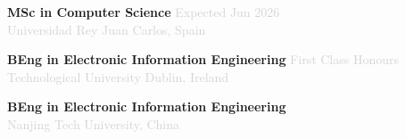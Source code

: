 \documentclass[9pt, a4paper]{article}
\begin{document}
\noindent\textbf{MSc in Computer Science} \hfill \textcolor{lightgray}{Expected Jun 2026}\\
\textcolor{lightgray}{Universidad Rey Juan Carlos, Spain}

\vspace{3pt}
\noindent\textbf{BEng in Electronic Information Engineering} \hfill \textcolor{lightgray}{First Class Honours}\\
\textcolor{lightgray}{Technological University Dublin, Ireland}

\vspace{3pt}
\noindent\textbf{BEng in Electronic Information Engineering}\\
\textcolor{lightgray}{Nanjing Tech University, China}
\end{document}
